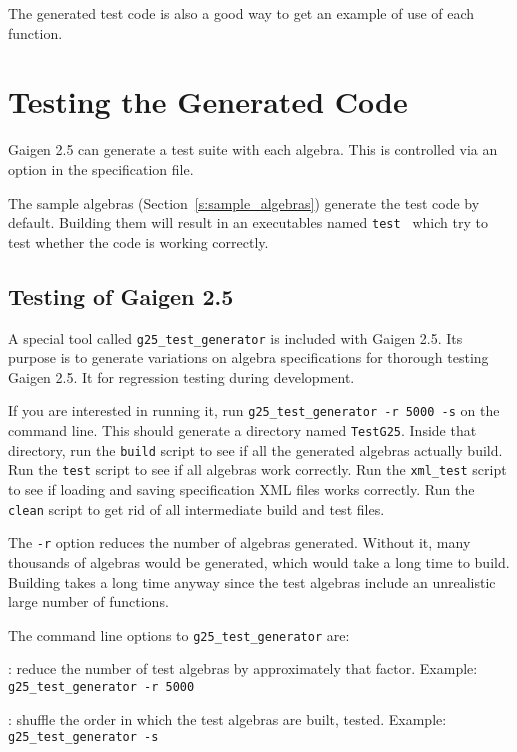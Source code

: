 \documentclass[10pt, a4paper]{article}
\begin{document}
The generated test code is also a good way to get an example
of use of each function.

\section{Testing the Generated Code}

Gaigen 2.5 can generate a test suite with each algebra.
This is controlled via an option in the specification file.

The sample algebras (Section~\ref{s:sample_algebras}) generate the test 
code by default. Building them will result in an executables named 
{\tt test } which try to test whether the code is working correctly. 


\subsection{Testing of Gaigen 2.5}

A special tool called {\tt g25\_test\_generator} is included with Gaigen 2.5.
Its purpose is to generate variations on algebra specifications for thorough testing
Gaigen 2.5. It for regression testing during development. 

If you are interested in running it, run {\tt g25\_test\_generator -r 5000 -s} on
the command line.
This should generate a directory named {\tt TestG25}. 
Inside that directory, run the {\tt build} script to see if all the
generated algebras actually build. Run the {\tt test} script to see if
all algebras work correctly. Run the {\tt xml\_test} script to see if
loading and saving specification XML files works correctly.
Run the {\tt clean} script to get rid of all intermediate build and test
files.

The {\tt -r} option reduces the number of algebras generated. Without it,
many thousands of algebras would be generated, which would take a long time to build.
Building takes a long time anyway since the test algebras include an unrealistic
large number of functions.

The command line options to {\tt g25\_test\_generator} are:
\vspace*{2mm}

: reduce the number of test algebras by approximately that factor.
Example: {\tt g25\_test\_generator -r 5000}

\vspace*{2mm}

: shuffle the order in which the test algebras are built, tested.
Example: {\tt g25\_test\_generator -s}
\end{document}
